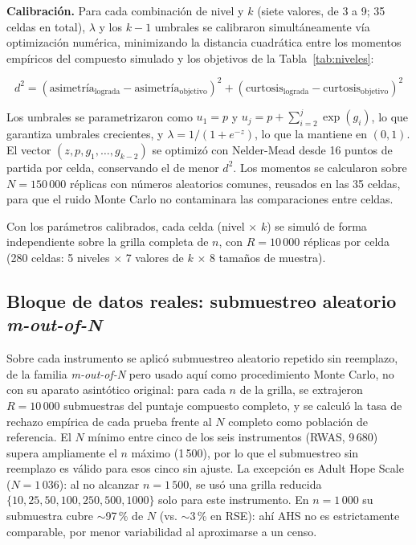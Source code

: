 \documentclass[man,mask,donotrepeattitle,floatsintext]{apa7}
\begin{document}
\textbf{Calibración.} Para cada combinación de nivel y $k$ (siete valores, de 3 a 9; 35 celdas en total), $\lambda$ y los $k-1$ umbrales se calibraron simultáneamente vía optimización numérica, minimizando la distancia cuadrática entre los momentos empíricos del compuesto simulado y los objetivos de la Tabla~\ref{tab:niveles}:

\begin{equation}
d^2 = (\text{asimetría}_{\text{lograda}} - \text{asimetría}_{\text{objetivo}})^2 + (\text{curtosis}_{\text{lograda}} - \text{curtosis}_{\text{objetivo}})^2
\end{equation}

Los umbrales se parametrizaron como $u_1 = p$ y $u_j = p + \sum_{i=2}^{j} \exp(g_i)$, lo que garantiza umbrales crecientes, y $\lambda = 1/(1+e^{-z})$, lo que la mantiene en $(0,1)$. El vector $(z, p, g_1, \ldots, g_{k-2})$ se optimizó con Nelder-Mead desde 16 puntos de partida por celda, conservando el de menor $d^2$. Los momentos se calcularon sobre $N=150\,000$ réplicas con números aleatorios comunes, reusados en las 35 celdas, para que el ruido Monte Carlo no contaminara las comparaciones entre celdas.

Con los parámetros calibrados, cada celda (nivel $\times$ $k$) se simuló de forma independiente sobre la grilla completa de $n$, con $R=10\,000$ réplicas por celda (280 celdas: 5 niveles $\times$ 7 valores de $k$ $\times$ 8 tamaños de muestra).

\subsection{Bloque de datos reales: submuestreo aleatorio \emph{m-out-of-N}}
\label{sec:realdata}

Sobre cada instrumento se aplicó submuestreo aleatorio repetido sin reemplazo, de la familia \emph{m-out-of-N} \parencite{politisromanowolf1999} pero usado aquí como procedimiento Monte Carlo, no con su aparato asintótico original: para cada $n$ de la grilla, se extrajeron $R=10\,000$ submuestras del puntaje compuesto completo, y se calculó la tasa de rechazo empírica de cada prueba frente al $N$ completo como población de referencia. El $N$ mínimo entre cinco de los seis instrumentos (RWAS, 9\,680) supera ampliamente el $n$ máximo (1\,500), por lo que el submuestreo sin reemplazo es válido para esos cinco sin ajuste. La excepción es Adult Hope Scale ($N=1\,036$): al no alcanzar $n=1\,500$, se usó una grilla reducida $\{10, 25, 50, 100, 250, 500, 1000\}$ solo para este instrumento. En $n=1\,000$ su submuestra cubre $\sim$97\,\% de $N$ (vs. $\sim$3\,\% en RSE): ahí AHS no es estrictamente comparable, por menor variabilidad al aproximarse a un censo.
\end{document}

